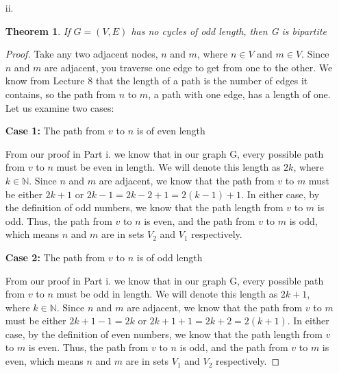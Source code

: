 \documentclass[10pt,letter]{article}
\newtheorem*{thm}{Theorem}
\begin{document}
\begin{enumerate}
\begin{proof}
\textbf{Case 2:} Assume this subpath has an even path length. Let us denote the path length of this subpath as $2k$, where $k \in \mathbb{N}$. Since the cycle is of even length, denoted as $2j$ where $j \in \mathbb{N}$, we know the remainder of the cycle must be of length $2j-2k = 2(j-k)$. Thus, by the definition of even numbers in Lecture 1, both the arbitrary subpath and the remainder are of even path length.

Therefore, for a cycle of even length, if the cycle is divided into two subpaths, both subpaths will be of even length, or both will be of odd length.
\end{proof}


\item[ii.] 

\begin{thm} If $G = (V, E)$ has no cycles of odd length, then G is bipartite \end{thm}

\begin{proof} Take any two adjacent nodes, $n$ and $m$, where $n \in V$ and $m \in V$. Since $n$ and $m$ are adjacent, you traverse one edge to get from one to the other. We know from Lecture 8 that the length of a path is the number of edges it contains, so the path from $n$ to $m$, a path with one edge, has a length of one. Let us examine two cases:

\textbf{Case 1:} The path from $v$ to $n$ is of even length

From our proof in Part i. we know that in our graph G, every possible path from $v$ to $n$ must be even in length. We will denote this length as $2k$, where $k \in \mathbb{N}$. Since $n$ and $m$ are adjacent, we know that the path from $v$ to $m$ must be either $2k+1$ or $2k-1 = 2k-2+1 = 2(k-1)+1$. In either case, by the definition of odd numbers, we know that the path length from $v$ to $m$ is odd. Thus, the path from $v$ to $n$ is even, and the path from $v$ to $m$ is odd, which means $n$ and $m$ are in sets $V_2$ and $V_1$ respectively.

\textbf{Case 2:} The path from $v$ to $n$ is of odd length

From our proof in Part i. we know that in our graph G, every possible path from $v$ to $n$ must be odd in length. We will denote this length as $2k+1$, where $k \in \mathbb{N}$. Since $n$ and $m$ are adjacent, we know that the path from $v$ to $m$ must be either $2k+1-1 = 2k$ or $2k+1+1 = 2k+2 = 2(k+1)$. In either case, by the definition of even numbers, we know that the path length from $v$ to $m$ is even. Thus, the path from $v$ to $n$ is odd, and the path from $v$ to $m$ is even, which means $n$ and $m$ are in sets $V_1$ and $V_2$ respectively.


\end{proof}
\end{enumerate}
\end{document}
